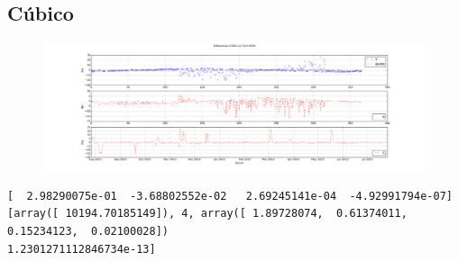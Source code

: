 \subsection*{C\'ubico}
\begin{figure}[!h]
\centering
  \includegraphics[width=\textwidth]{imagenes/sacDajusteG3}
\end{figure}
\begin{verbatim}
[  2.98290075e-01  -3.68802552e-02   2.69245141e-04  -4.92991794e-07]
[array([ 10194.70185149]), 4, array([ 1.89728074,  0.61374011,  0.15234123,  0.02100028])
1.2301271112846734e-13]
\end{verbatim}
